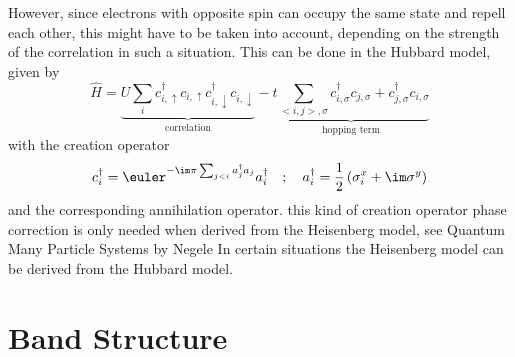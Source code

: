 \documentclass[a4paper,10pt]{report}
\begin{document}
However, since electrons with opposite spin can occupy the same state and repell each other, this might have to be taken into account, depending on the 
strength of the correlation in such a situation. 
This can be done in the Hubbard model, given by
\begin{equation}
 \hat{H} = \underbrace{U \sum_i c^{\dagger}_{i,\uparrow}c_{i,\uparrow} c^{\dagger}_{i,\downarrow}c_{i,\downarrow} }_{\text{correlation}}
	    -\underbrace{t \sum_{<i,j>,\sigma} c^{\dagger}_{i,\sigma}c_{j,\sigma} + c^{\dagger}_{j,\sigma}c_{i,\sigma} }_{\text{hopping term}}
\end{equation}
with the creation operator 
\begin{equation}
 c^{\dagger}_{i} = \euler^{-\im\pi \sum_{j<i} a^{\dagger}_j a_j } a^{\dagger}_i\quad ; \quad a^{\dagger}_i = \frac12 \left( \sigma^x_i + \im \sigma^y \right)
\end{equation}
and the corresponding annihilation operator. 
 this kind of creation operator phase correction is only needed when derived from the Heisenberg model, see Quantum Many Particle Systems by Negele
In certain situations the Heisenberg model can be derived from the Hubbard model. 

\section{Band Structure}

\end{document}
